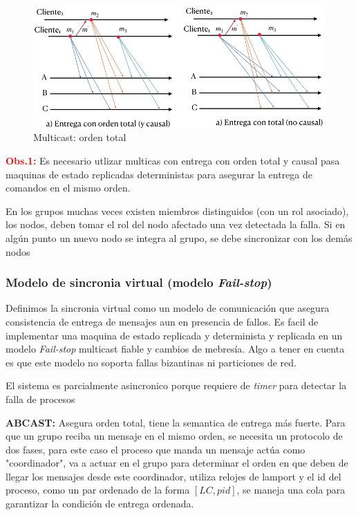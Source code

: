 \begin{figure}[H]
    \centering
    \includegraphics[width=0.7\linewidth]{img/multi_total.png}
    \caption{Multicast: orden total}\label{fig:1761678629682}
\end{figure}

\textcolor{red}{\textbf{Obs.1:}} Es necesario utlizar multicas con entrega con orden total y causal pasa maquinas de estado replicadas deterministas para asegurar la entrega de comandos en el mismo orden.

En los grupos muchas veces existen miembros distinguidos (con un rol asociado), los nodos, deben tomar el rol del nodo afectado una vez detectada la falla. Si en algún punto un nuevo nodo se integra al grupo, se debe sincronizar con los demás nodos
\subsubsection{Modelo de sincronia virtual (modelo \textit{Fail-stop})}
Definimos la sincronia virtual como un modelo de comunicación que asegura consistencia de entrega de mensajes aun en presencia de fallos. Es facil de implementar una maquina de estado replicada y determinista y replicada  en un modelo \textit{Fail-stop} multicast fiable y cambios de mebresía. Algo a tener en cuenta es que este modelo no soporta fallas bizantinas ni particiones de red.

El sistema es parcialmente asincronico porque requiere de \textit{timer} para detectar la falla de procesos 

\textbf{ABCAST:} Asegura orden total, tiene la semantica de entrega más fuerte. Para que un grupo reciba un mensaje en el mismo orden, se necesita un protocolo de dos fases, para este caso el proceso que manda un mensaje actúa como "coordinador", va a actuar en el grupo para determinar el orden en que deben de llegar los mensajes desde este coordinador, utiliza relojes de lamport y el id del proceso, como un par ordenado de la forma $\left[LC, \textit{pid}\right]$, se maneja una cola para garantizar la condición de entrega ordenada.

